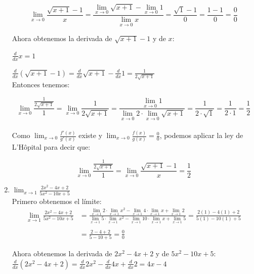 \documentclass[12pt]{article}
\begin{document}
\begin{enumerate}[\hspace{9px} a)]
        \[\displaystyle\lim_{x \to 0}\frac{\sqrt{x+1}-1}{x} = \frac{\displaystyle\lim_{x \to 0}\sqrt{x+1}-\displaystyle\lim_{x \to 0}1}{\displaystyle\lim_{x \to 0}x}=\frac{\sqrt{1}-1}{0}=\frac{1-1}{0}=\frac{0}{0}\]

        Ahora obtenemos la derivada de $\sqrt{x+1}-1$ y de $x$:

        \(\displaystyle\frac{d}{dx}x=1\)

        \(\displaystyle\frac{d}{dx}(\sqrt{x+1}-1)=\frac{d}{dx}\sqrt{x+1}-\frac{d}{dx}1=\frac{1}{2\sqrt{x+1}}\)\\

        Entonces tenemos:

        \[\displaystyle\lim_{x \to 0}\frac{\displaystyle\frac{1}{2\sqrt{x+1}}}{1}=\displaystyle\lim_{x \to 0}\frac{1}{2\sqrt{x+1}} = \frac{\displaystyle\lim_{x \to 0}1}{\displaystyle\lim_{x \to 0}2 \cdot \displaystyle\lim_{x \to 0}\sqrt{x+1}}=\frac{1}{2   \cdot \sqrt{1}}=\frac{1}{2 \cdot 1}=\frac{1}{2}\]\\

        Como \(\displaystyle\lim_{x \to 0}\frac{f'(x)}{g'(x)}\) existe y \(\displaystyle\lim_{x \to 0}\frac{f(x)}{g(x)}=\frac{0}{0}\), podemos aplicar la ley de L'H\^opital para decir que:

        \[\displaystyle\lim_{x \to 0}\frac{\displaystyle\frac{1}{2\sqrt{x+1}}}{1}=\displaystyle\lim_{x \to 0}\frac{\sqrt{x+1}-1}{x}=\frac{1}{2}\]

    \item \(\displaystyle\lim_{x \to 1}\frac{2x^2-4x+2}{5x^2-10x+5}\)\\
    
        Primero obtenemos el l\'imite:
        \begin{align*}     
            \displaystyle\lim_{x \to 1}\frac{2x^2-4x+2}{5x^2-10x+5}&=\frac{\displaystyle\lim_{x \to 1}2 \cdot \lim_{x \to 1}x^2 -\lim_{x \to 1}4 \cdot \lim_{x \to 1}x + \lim_{x \to 1}2}{\displaystyle\lim_{x \to 1}5 \cdot \lim_{x \to 1}x^2 - \lim_{x \to 1}10 \cdot \lim_{x \to 1}x + \lim_{x \to 1}5}=\frac{2(1)-4(1)+2}{5(1)-10(1)+5}\\ \\ 
            &= \frac{2-4+2}{5-10+5}=\frac{0}{0}
        \end{align*}

        Ahora obtenemos la derivada de $2x^2-4x+2$ y de $5x^2-10x+5$:\\

        \(\displaystyle\frac{d}{dx}(2x^2-4x+2)=\frac{d}{dx}2x^2-\frac{d}{dx}4x+\frac{d}{dx}2=4x-4\)


\end{enumerate}
\end{document}
